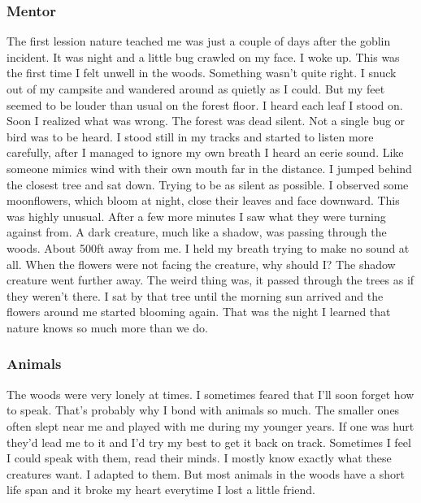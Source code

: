 \documentclass[letterpaper,10pt,twoside,twocolumn,openany]{book}
\begin{document}
	\subsubsection{Mentor}
	The first lession nature teached me was just a couple of days after the goblin incident. It was night and a little bug crawled on my face. I woke up. This was the first time I felt unwell in the woods. Something wasn’t quite right. I snuck out of my campsite and wandered around as quietly as I could. But my feet seemed to be louder than usual on the forest floor. I heard each leaf I stood on. Soon I realized what was wrong. The forest was dead silent. Not a single bug or bird was to be heard. I stood still in my tracks and started to listen more carefully, after I managed to ignore my own breath I heard an eerie sound. Like someone mimics wind with their own mouth far in the distance. I jumped behind the closest tree and sat down. Trying to be as silent as possible. I observed some moonflowers, which bloom at night, close their leaves and face downward. This was highly unusual. After a few more minutes I saw what they were turning against from. A dark creature, much like a shadow, was passing through the woods. About 500ft away from me. I held my breath trying to make no sound at all. When the flowers were not facing the creature, why should I? The shadow creature went further away. The weird thing was, it passed through the trees as if they weren’t there. I sat by that tree until the morning sun arrived and the flowers around me started blooming again. That was the night I learned that nature knows so much more than we do. 
	
	\subsubsection{Animals}
	The woods were very lonely at times. I sometimes feared that I'll soon forget how to speak. That's probably why I bond with animals so much. The smaller ones often slept near me and played with me during my younger years. If one was hurt they'd lead me to it and I'd try my best to get it back on track. Sometimes I feel I could speak with them, read their minds. I mostly know exactly what these creatures want. I adapted to them. But most animals in the woods have a short life span and it broke my heart everytime I lost a little friend. 
	
\end{document}
